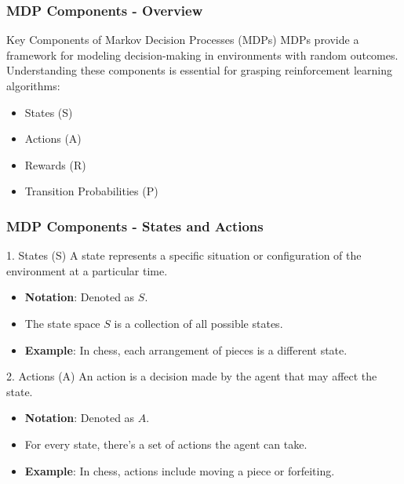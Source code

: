 \documentclass[aspectratio=169]{beamer}
\begin{document}
\begin{frame}[fragile]
    \frametitle{MDP Components - Overview}
    \begin{block}{Key Components of Markov Decision Processes (MDPs)}
        MDPs provide a framework for modeling decision-making in environments with random outcomes. Understanding these components is essential for grasping reinforcement learning algorithms:
    \end{block}
    \begin{itemize}
        \item States (S)
        \item Actions (A)
        \item Rewards (R)
        \item Transition Probabilities (P)
    \end{itemize}
\end{frame}

\begin{frame}[fragile]
    \frametitle{MDP Components - States and Actions}
    \begin{block}{1. States (S)}
        A state represents a specific situation or configuration of the environment at a particular time.
        \begin{itemize}
            \item \textbf{Notation}: Denoted as \( S \).
            \item The state space \( S \) is a collection of all possible states.
            \item \textbf{Example}: In chess, each arrangement of pieces is a different state.
        \end{itemize}
    \end{block}
    \begin{block}{2. Actions (A)}
        An action is a decision made by the agent that may affect the state.
        \begin{itemize}
            \item \textbf{Notation}: Denoted as \( A \).
            \item For every state, there’s a set of actions the agent can take.
            \item \textbf{Example}: In chess, actions include moving a piece or forfeiting.
        \end{itemize}
    \end{block}
\end{frame}
\end{document}
